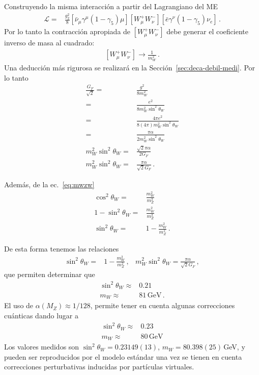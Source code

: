 \begin{frame}
Construyendo la misma interacción a partir del Lagrangiano del ME
\begin{align}
  \mathcal{L}=&\frac{g_2^2}{8}\left[\bar{\nu}_\mu\gamma^\mu(1-\gamma_5)\mu\right] \left[ W_{\mu}^{+}W_\nu^{-} \right]
  \left[\bar{e}\gamma^\nu(1-\gamma_5)\nu_e\right]\,.
\end{align}
Por lo tanto la contracción apropiada de $\left[ W_{\mu}^{+}W_{\nu}^{-} \right]$ debe generar el coeficiente inverso de masa al cuadrado:
\begin{align}
  \left[ W_{\mu}^{+}W_\nu^{-} \right]\to \frac{1}{m_W^2}\,.
\end{align}
Una deducción más rigurosa se realizará en la Sección~\ref{sec:deca-debil-medi}. Por lo tanto
\begin{align}
    \frac{G_F}{\sqrt{2}}=&\frac{g^2}{8m_W^2}\nonumber\\
=& \frac{e^2}{8m_W^2\sin^2\theta_W} \nonumber\\
=& \frac{4\pi e^2}{8(4 \pi) m_W^2\sin^2\theta_W} \nonumber\\
=& \frac{\pi\alpha }{2 m_W^2\sin^2\theta_W} \nonumber\\
m_{W}^2\sin^2\theta_W=&\frac{\sqrt{2}\pi\alpha }{2 G_F} \nonumber\\
m_{W}^2\sin^2\theta_W=&\frac{\pi\alpha }{\sqrt{2} G_F} \,.
\end{align}

Además, de la ec.~\eqref{eq:mwzw}
\begin{align}
  \cos^2\theta_W=&\frac{m_W^2}{m_Z^2} \nonumber\\
  1-\sin^2\theta_W=&\frac{m_W^2}{m_Z^2} \nonumber\\
  \sin^2\theta_W=&1-\frac{m_W^2}{m_Z^2} \,.
\end{align}


De esta forma tenemos las relaciones
\begin{align}
  \sin^2\theta_W=&1-\frac{m_W^2}{m_Z^2}\,,&m_W^2\sin^2\theta_W=\frac{\pi\alpha}{\sqrt{2}G_F}\,,
\end{align}
que permiten determinar que
\begin{align}
  \sin^2\theta_W\approx &0.21\nonumber\\
  m_W\approx &81\,\text{GeV}\,.
\end{align}
El uso de $\alpha(M_Z)\approx1/128$, permite tener en cuenta algunas correcciones cuánticas dando lugar a
\begin{align}
   \sin^2\theta_W\approx &0.23\nonumber\\
  m_W\approx &80\,\text{GeV}
\end{align}
Los valores medidos son $\sin^2\theta_W=0.23149(13)$, $m_W=80.398(25)\,$GeV, y pueden ser reproducidos por el modelo estándar una vez se tienen en cuenta correcciones perturbativas inducidas por partículas virtuales.


\end{frame}
